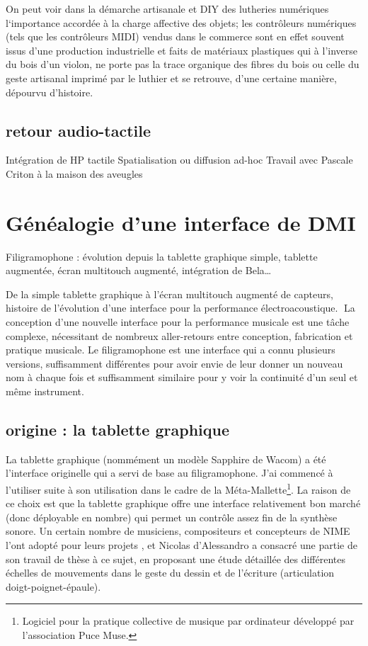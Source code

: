 \noindent On peut voir dans la démarche artisanale et \gls{DIY} des lutheries numériques l`importance accordée à la charge affective des objets; les contrôleurs numériques (tels que les contrôleurs \gls{MIDI}) vendus dans le commerce sont en effet souvent issus d'une production industrielle et faits de matériaux plastiques qui à l'inverse du bois d'un violon, ne porte pas la trace organique des fibres du bois ou celle du geste artisanal imprimé par le luthier et se retrouve, d'une certaine manière, dépourvu d'histoire.

\subsection{retour audio-tactile}
Intégration de HP tactile
Spatialisation ou diffusion ad-hoc
Travail avec Pascale Criton à la maison des aveugles


\section{Généalogie d’une interface de DMI}
\label{sec:interfaces:sec1}

Filigramophone : évolution depuis la tablette graphique simple, tablette augmentée, écran multitouch augmenté, intégration de Bela…

De la simple tablette graphique à l’écran multitouch augmenté de capteurs, histoire de l’évolution d’une interface pour la performance électroacoustique.
La conception d’une nouvelle interface pour la performance musicale est une tâche complexe, nécessitant de nombreux aller-retours entre conception, fabrication et pratique musicale. Le filigramophone est une interface qui a connu plusieurs versions, suffisamment différentes pour avoir envie de leur donner un nouveau nom à chaque fois et suffisamment similaire pour y voir la continuité d’un seul et même instrument.

\subsection{origine : la tablette graphique}
La tablette graphique (nommément un modèle Sapphire de Wacom) a été l’interface originelle qui a servi de base au filigramophone. J’ai commencé à l’utiliser suite à son utilisation dans le cadre de la Méta-Mallette\footnote{Logiciel pour la pratique collective de musique par ordinateur développé par l’association Puce Muse.}. La raison de ce choix est que la tablette graphique offre une interface relativement bon marché (donc déployable en nombre) qui permet un contrôle assez fin de la synthèse sonore.
Un certain nombre de musiciens, compositeurs et concepteurs de NIME l’ont adopté pour leurs projets \cite{zbyszynski_ten_2007}, et Nicolas d’Alessandro a consacré une partie de son travail de thèse \cite{dalessandro_realtime_2009} à ce sujet, en proposant une étude détaillée des différentes échelles de mouvements dans le geste du dessin et de l'écriture (articulation doigt-poignet-épaule).

